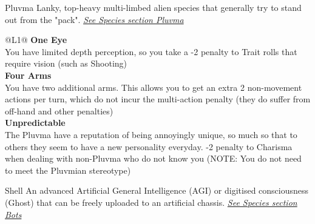 \begin{genericsection}{Pluvma}
  Lanky, top-heavy multi-limbed alien species that generally try to stand out from the "pack". \textit{\hyperref[sec:specie-pluvma]{See Species section Pluvma}}
\end{genericsection}
\begin{redtable}{\linewidth}{@{}L{1}@{}}
  \textbf{One Eye}\\
  You have limited depth perception, so you take a -2 penalty to Trait rolls that require vision (such as Shooting)\\
  \textbf{Four Arms}\\
  You have two additional arms. This allows you to get an extra 2 non-movement actions per turn, which do not incur the multi-action penalty (they do suffer from off-hand and other penalties)\\
  \textbf{Unpredictable}\\
  The Pluvma have a reputation of being annoyingly unique, so much so that to others they seem to have a new personality everyday. -2 penalty to Charisma when dealing with non-Pluvma who do not know you (NOTE: You do not need to meet the Pluvmian stereotype)\\
\end{redtable}

\vspace{\baselineskip}
  
\begin{genericsection}{Shell}
  An advanced Artificial General Intelligence (AGI) or digitised consciousness (Ghost) that can be freely uploaded to an artificial chassis. \textit{\hyperref[sec:specie-bots]{See Species section Bots}}
\end{genericsection}

\vspace{\baselineskip}

